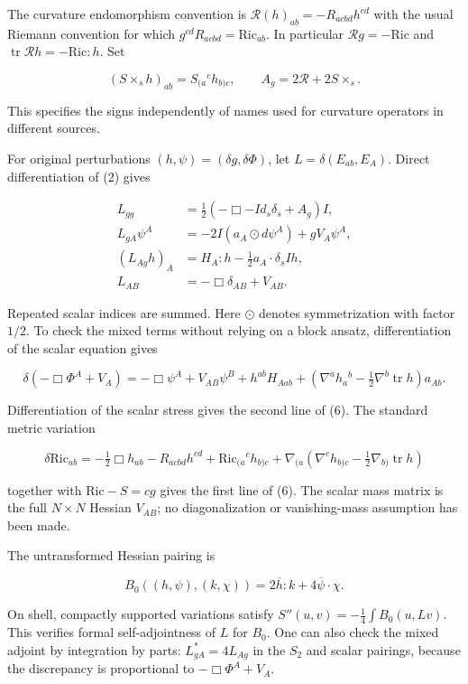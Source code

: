 The curvature endomorphism convention is $\mathcal R(h)_{ab}=-R_{acbd}h^{cd}$ with the usual Riemann convention for which $g^{cd}R_{acbd}=\mathrm{Ric}_{ab}$. In particular $\mathcal Rg=-\mathrm{Ric}$ and $\operatorname{tr}\mathcal Rh=-\mathrm{Ric}:h$. Set

\[
 (S\times_s h)_{ab}=S_{(a}{}^c h_{b)c},\qquad
 A_g=2\mathcal R+2S\times_s .
 \tag{5}
\]

This specifies the signs independently of names used for curvature operators in different sources.

For original perturbations $(h,\psi)=(\delta g,\delta\Phi)$, let $L=\delta(E_{ab},E_A)$. Direct differentiation of (2) gives

\[
\begin{aligned}
 L_{gg}&=\tfrac12(-\Box-I d_s\delta_s+A_g)I,\\
 L_{gA}\psi^A&=-2I(a_A\odot d\psi^A)+gV_A\psi^A,\\
 (L_{Ag}h)_A&=H_A:h-\tfrac12a_A\cdot\delta_s Ih,\\
 L_{AB}&=-\Box\delta_{AB}+V_{AB}.
\end{aligned}\tag{6}
\]

Repeated scalar indices are summed. Here $\odot$ denotes symmetrization with factor $1/2$. To check the mixed terms without relying on a block ansatz, differentiation of the scalar equation gives

\[
 \delta(-\Box\Phi^A+V_A)
 =-\Box\psi^A+V_{AB}\psi^B
 +h^{ab}H_{Aab}
 +(\nabla^ah_a{}^b-\tfrac12\nabla^b\operatorname{tr}h)a_{Ab}.
 \tag{7}
\]

Differentiation of the scalar stress gives the second line of (6). The standard metric variation

\[
 \delta\mathrm{Ric}_{ab}=-\tfrac12\Box h_{ab}
 -R_{acbd}h^{cd}+\mathrm{Ric}_{(a}{}^ch_{b)c}
 +\nabla_{(a}(\nabla^ch_{b)c}-\tfrac12\nabla_{b)}\operatorname{tr}h)
\]

together with $\mathrm{Ric}-S=cg$ gives the first line of (6). The scalar mass matrix is the full $N\times N$ Hessian $V_{AB}$; no diagonalization or vanishing-mass assumption has been made.

The untransformed Hessian pairing is

\[
 B_0((h,\psi),(k,\chi))=2\overline h:k+4\overline\psi\cdot\chi.
\]

On shell, compactly supported variations satisfy $S''(u,v)=-\tfrac14\int B_0(u,Lv)$. This verifies formal self-adjointness of $L$ for $B_0$. One can also check the mixed adjoint by integration by parts: $L_{gA}^*=4L_{Ag}$ in the $S_2$ and scalar pairings, because the discrepancy is proportional to $-\Box\Phi^A+V_A$.

